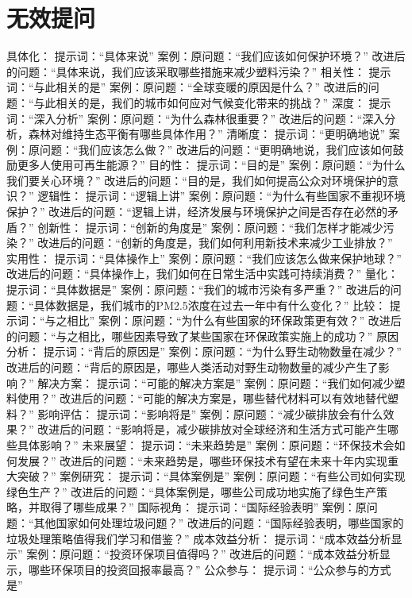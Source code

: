 \documentclass[12pt]{book}
\begin{document}
\section{无效提问}
具体化：
提示词：“具体来说”
案例：原问题：“我们应该如何保护环境？” 改进后的问题：“具体来说，我们应该采取哪些措施来减少塑料污染？”
相关性：
提示词：“与此相关的是”
案例：原问题：“全球变暖的原因是什么？” 改进后的问题：“与此相关的是，我们的城市如何应对气候变化带来的挑战？”
深度：
提示词：“深入分析”
案例：原问题：“为什么森林很重要？” 改进后的问题：“深入分析，森林对维持生态平衡有哪些具体作用？”
清晰度：
提示词：“更明确地说”
案例：原问题：“我们应该怎么做？” 改进后的问题：“更明确地说，我们应该如何鼓励更多人使用可再生能源？”
目的性：
提示词：“目的是”
案例：原问题：“为什么我们要关心环境？” 改进后的问题：“目的是，我们如何提高公众对环境保护的意识？”
逻辑性：
提示词：“逻辑上讲”
案例：原问题：“为什么有些国家不重视环境保护？” 改进后的问题：“逻辑上讲，经济发展与环境保护之间是否存在必然的矛盾？”
创新性：
提示词：“创新的角度是”
案例：原问题：“我们怎样才能减少污染？” 改进后的问题：“创新的角度是，我们如何利用新技术来减少工业排放？”
实用性：
提示词：“具体操作上”
案例：原问题：“我们应该怎么做来保护地球？” 改进后的问题：“具体操作上，我们如何在日常生活中实践可持续消费？”
量化：
提示词：“具体数据是”
案例：原问题：“我们的城市污染有多严重？” 改进后的问题：“具体数据是，我们城市的PM2.5浓度在过去一年中有什么变化？”
比较：
提示词：“与之相比”
案例：原问题：“为什么有些国家的环保政策更有效？” 改进后的问题：“与之相比，哪些因素导致了某些国家在环保政策实施上的成功？”
原因分析：
提示词：“背后的原因是”
案例：原问题：“为什么野生动物数量在减少？” 改进后的问题：“背后的原因是，哪些人类活动对野生动物数量的减少产生了影响？”
解决方案：
提示词：“可能的解决方案是”
案例：原问题：“我们如何减少塑料使用？” 改进后的问题：“可能的解决方案是，哪些替代材料可以有效地替代塑料？”
影响评估：
提示词：“影响将是”
案例：原问题：“减少碳排放会有什么效果？” 改进后的问题：“影响将是，减少碳排放对全球经济和生活方式可能产生哪些具体影响？”
未来展望：
提示词：“未来趋势是”
案例：原问题：“环保技术会如何发展？” 改进后的问题：“未来趋势是，哪些环保技术有望在未来十年内实现重大突破？”
案例研究：
提示词：“具体案例是”
案例：原问题：“有些公司如何实现绿色生产？” 改进后的问题：“具体案例是，哪些公司成功地实施了绿色生产策略，并取得了哪些成果？”
国际视角：
提示词：“国际经验表明”
案例：原问题：“其他国家如何处理垃圾问题？” 改进后的问题：“国际经验表明，哪些国家的垃圾处理策略值得我们学习和借鉴？”
成本效益分析：
提示词：“成本效益分析显示”
案例：原问题：“投资环保项目值得吗？” 改进后的问题：“成本效益分析显示，哪些环保项目的投资回报率最高？”
公众参与：
提示词：“公众参与的方式是”
\end{document}
